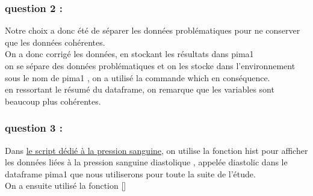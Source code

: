 \documentclass[
]{article}
\begin{document}
\subsubsection{question 2 :}\label{question-2}

Notre choix a donc été de séparer les données problématiques pour ne
conserver que les données cohérentes.\\
On a donc corrigé les données, en stockant les résultats dans {pima1}\\
on se sépare des données problématiques et on les stocke dans
l'environnement sous le nom de {pima1} , on a utilisé la commande
{which} en conséquence.\\
en ressortant le résumé du dataframe, on remarque que les variables sont
beaucoup plus cohérentes.

\subsubsection{question 3 :}\label{question-3}

Dans \href{pression_sanguine.R}{le script dédié à la pression sanguine},
on utilise la fonction {hist} pour afficher les données liées à la
pression sanguine diastolique , appelée {diastolic} dans le dataframe
{pima1} que nous utiliserons pour toute la suite de l'étude.\\
On a ensuite utilisé la fonction {[}{]}
\end{document}
